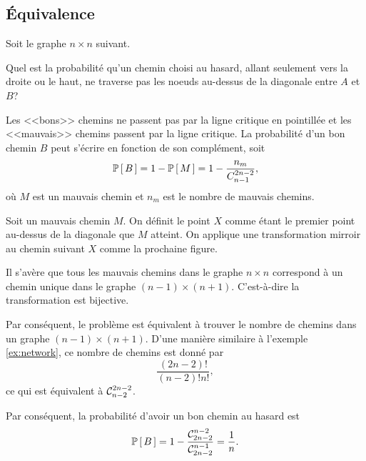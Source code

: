 \documentclass[11pt]{article}
\newcommand\comb[2]{%
	\ensuremath{%
		\mathcal{C}_{#2}^{#1}%
	}%
}%
\renewcommand\P[1]{%
	\ensuremath{%
		\mathbb{P}\left[\,#1\,\right]%
	}%
}%
\begin{document}
\subsection{Équivalence}
\begin{exemple}\label{ex:network_broken}
	Soit le graphe $n\times n$ suivant.
	\begin{figure}[H]
		\vspace{-3mm}
		\centering
		
		\vspace{-3mm}
	\end{figure}

	Quel est la probabilité qu'un chemin choisi au hasard, allant seulement
	vers la droite ou le haut, ne traverse pas les noeuds au-dessus de la
	diagonale entre $A$ et $B$?

	Les <<bons>> chemins ne passent pas par la ligne critique en pointillée et
	les <<mauvais>> chemins passent par la ligne critique. La probabilité d'un
	bon chemin $B$ peut s'écrire en fonction de son complément, soit
	\begin{equation*}
		\P{B}=1-\P{M}=1-\frac{n_m}{C_{n-1}^{2n-2}},
	\end{equation*}
	où $M$ est un mauvais chemin et $n_m$ est le nombre de mauvais chemins.

	Soit un mauvais chemin $M$. On définit le point $X$ comme étant le premier
	point au-dessus de la diagonale que $M$ atteint. On applique une
	transformation mirroir au chemin suivant $X$ comme la prochaine figure.

	\noindent
	\begin{minipage}{0.5\textwidth}
		\begin{figure}[H]
			\centering
			
		\end{figure}
	\end{minipage}%
	\begin{minipage}{0.5\textwidth}
		\begin{figure}[H]
			\centering
			
		\end{figure}
	\end{minipage}
\end{exemple}
\addtocounter{exemple}{-1}
\begin{exemple}[suite]
	Il s'avère que tous les mauvais chemins dans le graphe $n\times n$
	correspond à un chemin unique dans le graphe $(n-1)\times(n+1)$.
	C'est-à-dire la transformation est bijective.
	
	Par conséquent, le problème est équivalent à trouver le nombre de chemins
	dans un graphe $(n-1)\times(n+1)$. D'une manière similaire à l'exemple
	\ref{ex:network}, ce nombre de chemins est donné par
	\begin{equation*}
		\frac{(2n-2)!}{(n-2)!n!},
	\end{equation*}
	ce qui est équivalent à $\comb{2n-2}{n-2}$.

	Par conséquent, la probabilité d'avoir un bon chemin au hasard est
	\begin{equation*}
		\P{B}
		=1-\frac{\comb{n-2}{2n-2}}{\comb{n-1}{2n-2}}
		=\frac{1}{n}.
	\end{equation*}
\end{exemple}
\end{document}
